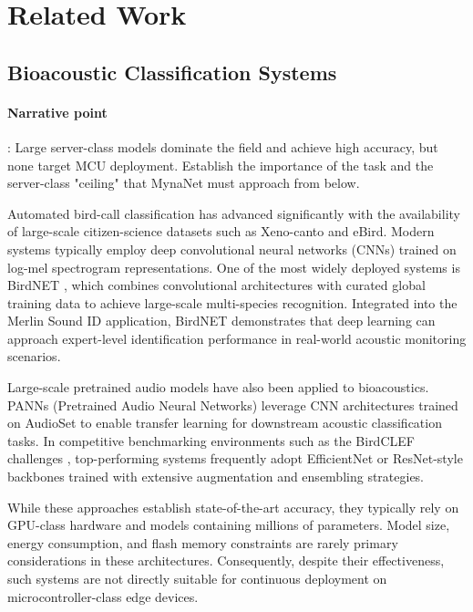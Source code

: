 \documentclass[final,5p,times,twocolumn,nolinenum]{elsarticle}
\begin{document}
\label{sec:related}
\section{Related Work}

\subsection{Bioacoustic Classification Systems}


\paragraph{Narrative point}:
Large server-class models dominate the field and achieve high accuracy,
but none target MCU deployment. Establish the importance of the task and
the server-class "ceiling" that MynaNet must approach from below.

Automated bird-call classification has advanced significantly with the availability of large-scale citizen-science datasets such as Xeno-canto and eBird. Modern systems typically employ deep convolutional neural networks (CNNs) trained on log-mel spectrogram representations. One of the most widely deployed systems is BirdNET \cite{kahl2021birdnet}, which combines convolutional architectures with curated global training data to achieve large-scale multi-species recognition. Integrated into the Merlin Sound ID application, BirdNET demonstrates that deep learning can approach expert-level identification performance in real-world acoustic monitoring scenarios.

Large-scale pretrained audio models have also been applied to bioacoustics. PANNs (Pretrained Audio Neural Networks) \cite{kong2020panns} leverage CNN architectures trained on AudioSet to enable transfer learning for downstream acoustic classification tasks. In competitive benchmarking environments such as the BirdCLEF challenges \cite{goerlich2022overview}, top-performing systems frequently adopt EfficientNet or ResNet-style backbones trained with extensive augmentation and ensembling strategies.

While these approaches establish state-of-the-art accuracy, they typically rely on GPU-class hardware and models containing millions of parameters. Model size, energy consumption, and flash memory constraints are rarely primary considerations in these architectures. Consequently, despite their effectiveness, such systems are not directly suitable for continuous deployment on microcontroller-class edge devices.
\end{document}
